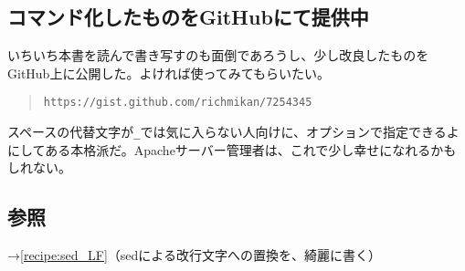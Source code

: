 \subsection*{コマンド化したものをGitHubにて提供中}

いちいち本書を読んで書き写すのも面倒であろうし、少し改良したものをGitHub上に公開した。よければ使ってみてもらいたい。

\begin{quote}
	\verb|https://gist.github.com/richmikan/7254345|
\end{quote}

スペースの代替文字が\verb|_|では気に入らない人向けに、オプションで指定できるよにしてある本格派だ。Apacheサーバー管理者は、これで少し幸せになれるかもしれない。

\subsection*{参照}

\noindent
→\ref{recipe:sed_LF}（sedによる改行文字への置換を、綺麗に書く）
